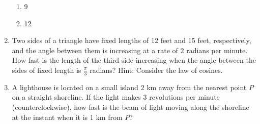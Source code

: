 \documentclass[12pt]{article}
\newif\ifans
\begin{document}
\begin{enumerate}
\begin{enumerate}
\item 9

\item 12

\end{enumerate}

\ifans{\fbox{E}} \fi

\item Two sides of a triangle have fixed lengths of 12 feet and 15 feet, respectively, and the angle between them is increasing at a rate of $2$ radians per minute.  How fast is the length of the third side increasing when the angle between the sides of fixed length is $\frac{\pi}{3}$ radians?  Hint: Consider the law of cosines.

\ifans{\fbox{$\frac{60}{\sqrt{7}}$ feet per minute}} \fi

\item A lighthouse is located on a small island $2$ km away from the nearest point $P$ on a straight shoreline.  If the light makes 3 revolutions per minute (counterclockwise), how fast is the beam of light moving along the shoreline at the instant when it is 1 km from $P$?

\ifans{\fbox{$15\pi$ km per minute}} \fi

\end{enumerate}
\end{document}
